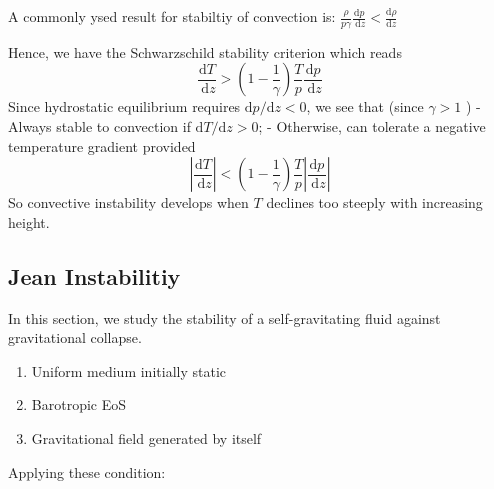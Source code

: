 \documentclass[12pt,a4paper]{article}
\begin{document}
A commonly ysed result for stabiltiy of convection is:
$\frac{\rho}{p \gamma} \frac{\mathrm{d} p}{\mathrm{~d} z}<\frac{\mathrm{d} \rho}{\mathrm{d} z}$

Hence, we have the Schwarzschild stability criterion which reads
$$
\frac{\mathrm{d} T}{\mathrm{~d} z}>\left(1-\frac{1}{\gamma}\right) \frac{T}{p} \frac{\mathrm{d} p}{\mathrm{~d} z}
$$
Since hydrostatic equilibrium requires $\mathrm{d} p / \mathrm{d} z<0$, we see that (since $\gamma>1$ )
- Always stable to convection if $\mathrm{d} T / \mathrm{d} z>0$;
- Otherwise, can tolerate a negative temperature gradient provided
$$
\left|\frac{\mathrm{d} T}{\mathrm{~d} z}\right|<\left(1-\frac{1}{\gamma}\right) \frac{T}{p}\left|\frac{\mathrm{d} p}{\mathrm{~d} z}\right|
$$
So convective instability develops when $T$ declines too steeply with increasing height.
\subsection{Jean Instabilitiy}
In this section, we study the stability of a self-gravitating fluid against gravitational collapse.
\begin{enumerate}
    \item Uniform medium initially static
    \item Barotropic EoS
    \item Gravitational field generated by itself
\end{enumerate}
Applying these condition:
\end{document}
